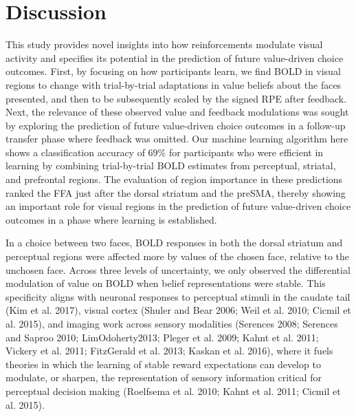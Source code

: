 \documentclass[]{article}
\begin{document}
\hypertarget{discussion}{%
\section{Discussion}\label{discussion}}

This study provides novel insights into how reinforcements modulate
visual activity and specifies its potential in the prediction of future
value-driven choice outcomes. First, by focusing on how participants
learn, we find BOLD in visual regions to change with trial-by-trial
adaptations in value beliefs about the faces presented, and then to be
subsequently scaled by the signed RPE after feedback. Next, the
relevance of these observed value and feedback modulations was sought by
exploring the prediction of future value-driven choice outcomes in a
follow-up transfer phase where feedback was omitted. Our machine
learning algorithm here shows a classification accuracy of \(69\%\) for
participants who were efficient in learning by combining trial-by-trial
BOLD estimates from perceptual, striatal, and prefrontal regions. The
evaluation of region importance in these predictions ranked the FFA just
after the dorsal striatum and the preSMA, thereby showing an important
role for visual regions in the prediction of future value-driven choice
outcomes in a phase where learning is established.

In a choice between two faces, BOLD responses in both the dorsal
striatum and perceptual regions were affected more by values of the
chosen face, relative to the unchosen face. Across three levels of
uncertainty, we only observed the differential modulation of value on
BOLD when belief representations were stable. This specificity aligns
with neuronal responses to perceptual stimuli in the caudate tail (Kim
et al. 2017), visual cortex (Shuler and Bear 2006; Weil et al. 2010;
Cicmil et al. 2015), and imaging work across sensory modalities
(Serences 2008; Serences and Saproo 2010; LimOdoherty2013; Pleger et al.
2009; Kahnt et al. 2011; Vickery et al. 2011; FitzGerald et al. 2013;
Kaskan et al. 2016), where it fuels theories in which the learning of
stable reward expectations can develop to modulate, or sharpen, the
representation of sensory information critical for perceptual decision
making (Roelfsema et al. 2010; Kahnt et al. 2011; Cicmil et al. 2015).
\end{document}
